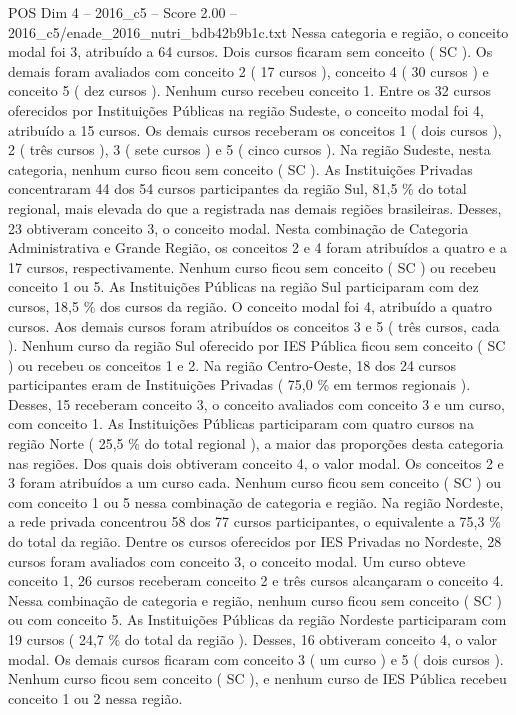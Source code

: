 \begin{textsample}{POS Dim 4 – 2016\_c5 – Score 2.00 – 2016\_c5/enade\_2016\_nutri\_bdb42b9b1c.txt}
Nessa categoria e região, o conceito modal foi 3, atribuído a 64 cursos.
Dois cursos ficaram sem conceito ( SC ).
Os demais foram avaliados com conceito 2 ( 17 cursos ), conceito 4 ( 30 cursos ) e conceito 5 ( dez cursos ).
Nenhum curso recebeu conceito 1.
Entre os 32 cursos oferecidos por Instituições Públicas na região Sudeste, o conceito modal foi 4, atribuído a 15 cursos.
Os demais cursos receberam os conceitos 1 ( dois cursos ), 2 ( três cursos ), 3 ( sete cursos ) e 5 ( cinco cursos ).
Na região Sudeste, nesta categoria, nenhum curso ficou sem conceito ( SC ).
As Instituições Privadas concentraram 44 dos 54 cursos participantes da região Sul, 81,5 \% do total regional, mais elevada do que a registrada nas demais regiões brasileiras.
Desses, 23 obtiveram conceito 3, o conceito modal.
Nesta combinação de Categoria Administrativa e Grande Região, os conceitos 2 e 4 foram atribuídos a quatro e a 17 cursos, respectivamente.
Nenhum curso ficou sem conceito ( SC ) ou recebeu conceito 1 ou 5.
As Instituições Públicas na região Sul participaram com dez cursos, 18,5 \% dos cursos da região.
O conceito modal foi 4, atribuído a quatro cursos.
Aos demais cursos foram atribuídos os conceitos 3 e 5 ( três cursos, cada ).
Nenhum curso da região Sul oferecido por IES Pública ficou sem conceito ( SC ) ou recebeu os conceitos 1 e 2.
Na região Centro-Oeste, 18 dos 24 cursos participantes eram de Instituições Privadas ( 75,0 \% em termos regionais ).
Desses, 15 receberam conceito 3, o conceito avaliados com conceito 3 e um curso, com conceito 1.
As Instituições Públicas participaram com quatro cursos na região Norte ( 25,5 \% do total regional ), a maior das proporções desta categoria nas regiões.
Dos quais dois obtiveram conceito 4, o valor modal.
Os conceitos 2 e 3 foram atribuídos a um curso cada.
Nenhum curso ficou sem conceito ( SC ) ou com conceito 1 ou 5 nessa combinação de categoria e região.
Na região Nordeste, a rede privada concentrou 58 dos 77 cursos participantes, o equivalente a 75,3 \% do total da região.
Dentre os cursos oferecidos por IES Privadas no Nordeste, 28 cursos foram avaliados com conceito 3, o conceito modal.
Um curso obteve conceito 1, 26 cursos receberam conceito 2 e três cursos alcançaram o conceito 4.
Nessa combinação de categoria e região, nenhum curso ficou sem conceito ( SC ) ou com conceito 5.
As Instituições Públicas da região Nordeste participaram com 19 cursos ( 24,7 \% do total da região ).
Desses, 16 obtiveram conceito 4, o valor modal.
Os demais cursos ficaram com conceito 3 ( um curso ) e 5 ( dois cursos ).
Nenhum curso ficou sem conceito ( SC ), e nenhum curso de IES Pública recebeu conceito 1 ou 2 nessa região.

\end{textsample}
